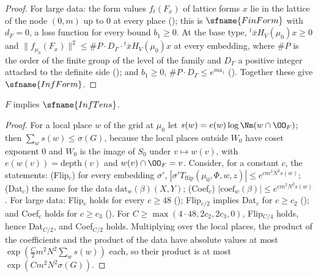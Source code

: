\begin{proof}
For large data: the form values $f_t(F_x)$ of lattice forms $x$ lie in the lattice of the node $(0,m)$ up to $0$ at every place
(); this is $\sfname{FinForm}$ with $d_F=0$, a loss
function for every bound $b_1\ge0$. At the base type, ${}^t\bar xH_V(\mu_0)x\ge0$ and
$\|f_{\mu_0}(F_x)\|^2\le\#P\cdot D_\Gamma\cdot{}^t\bar xH_V(\mu_0)x$ at every embedding, where $\#P$ is the order of the finite
group of the level of the family and $D_\Gamma$ a positive integer attached to the definite side \cite{LeanSource2026} (); and $b_1\ge0$,
$\#P\cdot D_\Gamma\le e^{ma_1}$ (). Together these give
$\sfname{InfForm}$.
\end{proof}

\begin{theorem}\label{pf:fit:tensor}
$F$ implies $\sfname{InfTens}$.
\end{theorem}

\begin{proof}
For a local place $w$ of the grid at $\mu_0$ let $s(w)=e(w)\log\Nm(w\cap\OO_F)$; then $\sum_ws(w)\le\sigma(G)$, because the
local places outside $W_0$ have coset exponent $0$ and $W_0$ is the image of $S_0$ under $v\mapsto w(v)$, with
$e(w(v))=\mathrm{depth}(v)$ and $w(v)\cap\OO_F=v$. Consider, for a constant $c$, the statements: (Flip$_c$) for every embedding
$\sigma'$, $|\sigma'T_{\mathrm{flip}}(\mu_0,\Phi,w,z)|\le e^{cm^2N^2s(w)}$; (Dat$_c$) the same for the data
$\mathrm{dat}_w(\beta)(X,Y)$; (Coef$_c$) $|\mathrm{coef}_w(\beta)|\le e^{cm^2N^2s(w)}$. For large data: Flip$_c$ holds for
every $c\ge48$ (); Flip$_{c/2}$ implies Dat$_c$ for $c\ge c_2$
(); and Coef$_c$ holds for $c\ge c_3$
(). For $C\ge\max(4\cdot48,2c_2,2c_3,0)$, Flip$_{C/4}$ holds, hence
Dat$_{C/2}$, and Coef$_{C/2}$ holds. Multiplying over the
local places, the product of the coefficients and the product of the data have absolute values at most
$\exp(\tfrac C2m^2N^2\sum_ws(w))$ each, so their product is at most $\exp(Cm^2N^2\sigma(G))$.
\end{proof}

